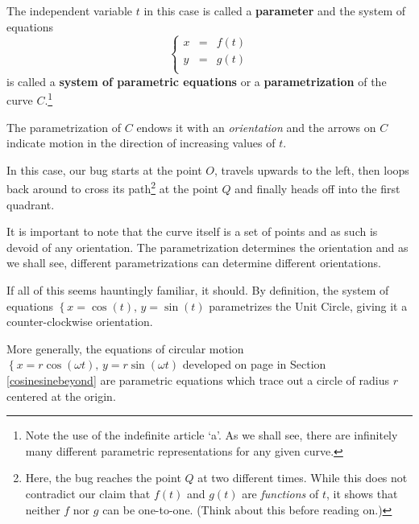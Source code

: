 \smallskip

The independent variable $t$ in this case is called a  \textbf{parameter} and the system of equations \[\left\{ \begin{array}{rcl} x & = & f(t) \\ y & = & g(t) \\ \end{array} \right.\] is called a  \textbf{system of parametric equations} or a  \textbf{parametrization} of the curve $C$.\footnote{Note the use of the indefinite article `a'.  As we shall see, there are infinitely many different parametric representations for any given curve.}   

\smallskip

The parametrization of $C$ endows it with an  \textit{orientation} and the arrows on $C$ indicate motion in the direction of increasing values of $t$. 

\smallskip

In this case, our bug starts at the point $O$, travels upwards to the left, then loops back around to cross its path\footnote{Here, the bug reaches the point $Q$ at two different times. While this does not contradict our claim that $f(t)$ and $g(t)$ are \textit{functions} of $t$, it shows that neither $f$ nor $g$ can be one-to-one.  (Think about this before reading on.)} at the point $Q$ and finally heads off into the first quadrant. 

\smallskip

  It is important to note that the curve itself is a set of points and as such is devoid of any orientation.  The parametrization determines the orientation and as we shall see, different parametrizations can determine different orientations. 
  
  \smallskip
  
  If all of this seems hauntingly familiar, it should.  By definition, the system of equations $\left\{ x = \cos(t), \, y = \sin(t) \right.$ parametrizes the Unit Circle, giving it a counter-clockwise orientation.  
  
  \smallskip
  
  More generally, the equations of circular motion $\left\{ x = r\cos(\omega t), \, y = r\sin(\omega t) \right.$ developed on page \pageref{equationsforcircularmotion} in Section \ref{cosinesinebeyond} are parametric equations which trace out a circle of radius $r$ centered at the origin. 
  
